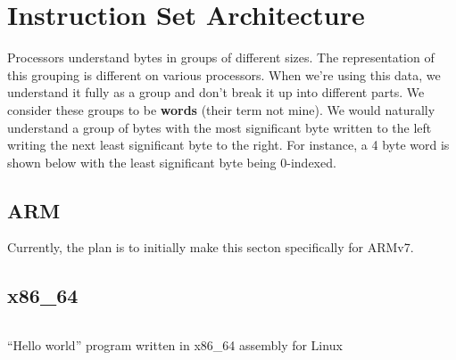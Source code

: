 \chapter{Instruction Set Architecture}

Processors understand bytes in groups of different sizes. The representation of
this grouping is different on various processors. When we're using this data, we
understand it fully as a group and don't break it up into different parts. We
consider these groups to be \textbf{words} (their term not mine). We would
naturally understand a group of bytes with the most significant byte written to
the left writing the next least significant byte to the right. For instance, a 4
byte word is shown below with the least significant byte being 0-indexed.

\begin{center}
\end{center}

\section{ARM}

Currently, the plan is to initially make this secton specifically for ARMv7.

\section{x86\_64}

\begin{listing}[H]
  \inputminted[frame=lines]{asm}{code/hello_world.asm}
  \caption{``Hello world'' program written in x86\_64 assembly for Linux}
  \label{lst:hello-world-asm}
\end{listing}

